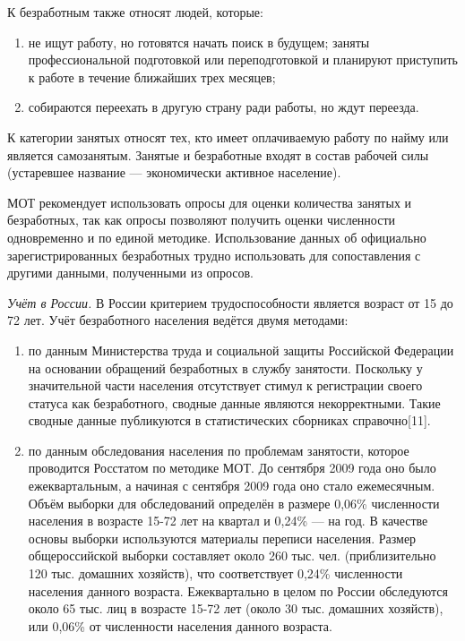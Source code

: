 К безработным также относят людей, которые:
\begin{enumerate}
    \item не ищут работу, но готовятся начать поиск в будущем;
          заняты профессиональной подготовкой или переподготовкой и планируют приступить к работе в течение ближайших трех месяцев;
    \item собираются переехать в другую страну ради работы, но ждут переезда.
\end{enumerate}
К категории занятых относят тех, кто имеет оплачиваемую работу по найму или является самозанятым. Занятые и безработные входят в состав рабочей силы (устаревшее название — экономически активное население).

МОТ рекомендует использовать опросы для оценки количества занятых и безработных, так как опросы позволяют получить оценки численности одновременно и по единой методике. Использование данных об официально зарегистрированных безработных трудно использовать для сопоставления с другими данными, полученными из опросов.

\textit{Учёт в России.} В России критерием трудоспособности является возраст от 15 до 72 лет. Учёт безработного населения ведётся двумя методами:
\begin{enumerate}
    \item по данным Министерства труда и социальной защиты Российской Федерации на основании обращений безработных в службу занятости. Поскольку у значительной части населения отсутствует стимул к регистрации своего статуса как безработного, сводные данные являются некорректными. Такие сводные данные публикуются в статистических сборниках справочно[11].
    \item по данным обследования населения по проблемам занятости, которое проводится Росстатом по методике МОТ. До сентября 2009 года оно было ежеквартальным, а начиная с сентября 2009 года оно стало ежемесячным. Объём выборки для обследований определён в размере 0,06\% численности населения в возрасте 15-72 лет на квартал и 0,24\% — на год. В качестве основы выборки используются материалы переписи населения. Размер общероссийской выборки составляет около 260 тыс. чел. (приблизительно 120 тыс. домашних хозяйств), что соответствует 0,24\% численности населения данного возраста. Ежеквартально в целом по России обследуются около 65 тыс. лиц в возрасте 15-72 лет (около 30 тыс. домашних хозяйств), или 0,06\% от численности населения данного возраста.
\end{enumerate}

